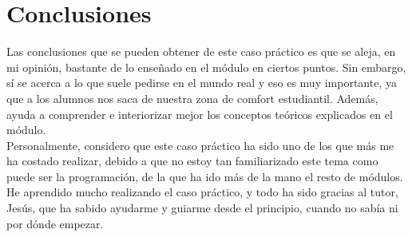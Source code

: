 \documentclass[a4paper,10pt,titlepage,oneside,openright]{book}
\begin{document}
\medskip
\section{Conclusiones}
Las conclusiones que se pueden obtener de este caso práctico es que se aleja, en mi opinión, bastante de lo enseñado en el módulo en ciertos puntos. Sin embargo, sí se acerca a lo que suele pedirse en el mundo real y eso es muy importante, ya que a los alumnos nos saca de nuestra zona de comfort estudiantil. Además, ayuda a comprender e interiorizar mejor los conceptos teóricos explicados en el módulo.\\

Personalmente, considero que este caso práctico ha sido uno de los que más me ha costado realizar, debido a que no estoy tan familiarizado este tema como puede ser la programación, de la que ha ido más de la mano el resto de módulos. He aprendido mucho realizando el caso práctico, y todo ha sido gracias al tutor, Jesús, que ha sabido ayudarme y guiarme desde el principio, cuando no sabía ni por dónde empezar.
\end{document}
